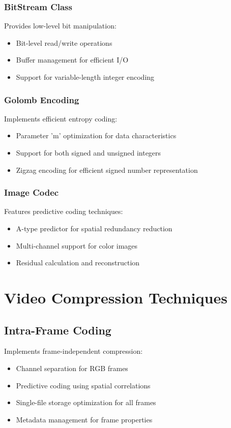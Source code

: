 \documentclass[a4paper,14pt]{article}
\begin{document}
\subsubsection{BitStream Class}
Provides low-level bit manipulation:
\begin{itemize}
    \item Bit-level read/write operations
    \item Buffer management for efficient I/O
    \item Support for variable-length integer encoding
\end{itemize}

\subsubsection{Golomb Encoding}
Implements efficient entropy coding:
\begin{itemize}
    \item Parameter 'm' optimization for data characteristics
    \item Support for both signed and unsigned integers
    \item Zigzag encoding for efficient signed number representation
\end{itemize}

\subsubsection{Image Codec}
Features predictive coding techniques:
\begin{itemize}
    \item A-type predictor for spatial redundancy reduction
    \item Multi-channel support for color images
    \item Residual calculation and reconstruction
\end{itemize}

\section{Video Compression Techniques}

\subsection{Intra-Frame Coding}
Implements frame-independent compression:
\begin{itemize}
    \item Channel separation for RGB frames
    \item Predictive coding using spatial correlations
    \item Single-file storage optimization for all frames
    \item Metadata management for frame properties
\end{itemize}
\end{document}
